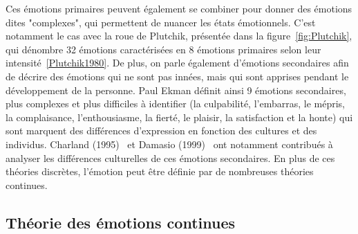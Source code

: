 Ces émotions primaires peuvent également se combiner pour donner des émotions dites "complexes", qui permettent de nuancer les états émotionnels. C'est notamment le cas avec la roue de Plutchik, présentée dans la figure~\ref{fig:Plutchik}, qui dénombre 32 émotions caractérisées en 8 émotions primaires selon leur intensité~\ref{Plutchik1980}. De plus, on parle également d'émotions secondaires afin de décrire des émotions qui ne sont pas innées, mais qui sont apprises pendant le développement de la personne. Paul Ekman définit ainsi 9 émotions secondaires, plus complexes et plus difficiles à identifier (la culpabilité, l'embarras, le mépris, la complaisance, l'enthousiasme, la fierté, le plaisir, la satisfaction et la honte) qui sont marquent des différences d'expression en fonction des cultures et des individus. Charland (1995)~\cite{Charland1995} et Damasio (1999)~\cite{Damasio1999} ont notamment contribués à analyser les différences culturelles de ces émotions secondaires.
En plus de ces théories discrètes, l'émotion peut être définie par de nombreuses théories continues.

\subsection{Théorie des émotions continues}


